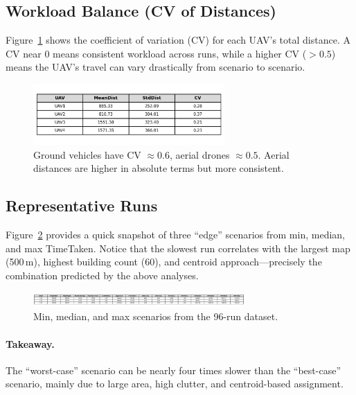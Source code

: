 \documentclass[12pt,a4paper]{report}
\begin{document}
\subsection{Workload Balance (CV of Distances)}
Figure~\ref{fig:uavdistcv} shows the coefficient of variation (CV) for each UAV’s total distance.  
A CV near 0 means consistent workload across runs, while a higher CV ($>0.5$) means 
the UAV’s travel can vary drastically from scenario to scenario.

\begin{figure}[H]
\centering
\includegraphics[width=0.65\textwidth]{analysis/uav_cv_table.png}
\caption{Ground vehicles have CV $\approx0.6$, aerial drones $\approx0.5$. Aerial distances are higher in absolute terms but more consistent.}
\label{fig:uavdistcv}
\end{figure}


\subsection{Representative Runs}
Figure~\ref{fig:repruns} provides a quick snapshot of three “edge” scenarios from min, median, 
and max TimeTaken. Notice that the slowest run correlates with the largest map (500\,m), 
highest building count (60), and centroid approach—precisely the combination predicted by 
the above analyses.

\begin{figure}[H]
\centering
\includegraphics[width=0.72\textwidth]{analysis/representative_runs.png}
\caption{Min, median, and max scenarios from the 96-run dataset.}
\label{fig:repruns}
\end{figure}

\paragraph{Takeaway.}  
The “worst-case” scenario can be nearly four times slower than the “best-case” scenario, 
mainly due to large area, high clutter, and centroid-based assignment.

\end{document}
